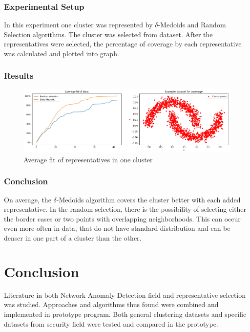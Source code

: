 \documentclass[thesis=B,english]{FITthesis}[2012/10/20]
\begin{document}
\subsection{Experimental Setup}
In this experiment one cluster was represented by $\delta$-Medoids and Random Selection algorithms.
The cluster was selected from dataset.
After the representatives were selected, the percentage of coverage by each representative was calculated and plotted into graph.


\subsection{Results}

\begin{figure}[H]
   \includegraphics[width=\linewidth]{img/exp5.png}
  \caption{Average fit of representatives in one cluster}
  \label{img:exp5}
\end{figure}

\subsection{Conclusion}
On average, the $\delta$-Medoids algorithm covers the cluster better with each added representative.
In the random selection, there is the possibility of selecting either the border cases or two points with overlapping neighborhoods.
This can occur even more often in data, that do not have standard distribution and can be denser in one part of a cluster than the other.



\chapter{Conclusion}
Literature in both Network Anomaly Detection field and representative selection was studied.
Approaches and algorithms thus found were combined and implemented in prototype program.
Both general clustering datasets and specific datasets from security field were tested and compared in the prototype.
\end{document}
